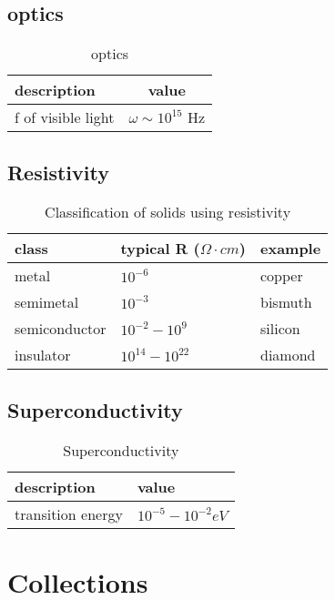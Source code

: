 \subsection{optics}
\begin{table}[h]
    \centering
    \caption{optics}
    \label{tab:optics}
    \begin{tabular}{l | c}
	\hline
	description & value \\
	\hline
	f of visible light  & $\omega \sim 10^{15}$ Hz   \\
	\hline
    \end{tabular}
\end{table}

\subsection{Resistivity}
\begin{table}[h]
    \centering
    \caption{Classification of solids using resistivity}
    \label{tab:resistivity}
    \begin{tabular}{l  l  l}
	\hline
	class	& typical R ($\Omega \cdot cm$)	& example   \\
	\hline
	metal	    & $10^{-6}$ & copper	\\
	semimetal   & $10^{-3}$	& bismuth	\\
	semiconductor	& $10^{-2}-10^{9}$ &	silicon	\\
	insulator   & $10^{14}-10^{22}$	    & diamond	\\
	\hline
    \end{tabular}
\end{table}


\subsection{Superconductivity}
\begin{table}[h]
    \centering
    \caption{Superconductivity}
    \label{tab:superconductivity}
    \begin{tabular}{l | l}
	\hline
	description &	value	\\
	\hline
	transition energy   & $10^{-5}-10^{-2} eV$  \\
	\hline
    \end{tabular}
\end{table}
\section{Collections}

